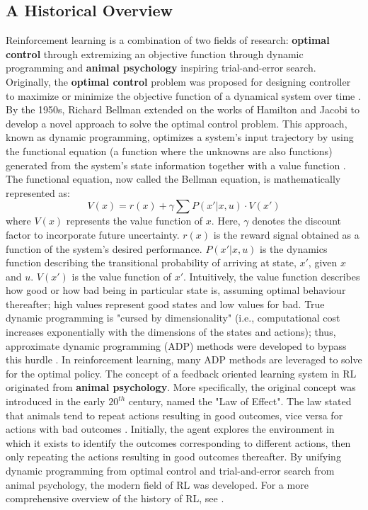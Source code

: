 \subsection{A Historical Overview}
Reinforcement learning is a combination of two fields of research: \textbf{optimal control} through extremizing an objective function through dynamic programming and \textbf{animal psychology} inspiring trial-and-error search. Originally, the \textbf{optimal control} problem was proposed for designing controller to maximize or minimize the objective function of a dynamical system over time \cite{mpc}.  By the 1950s, Richard Bellman extended on the works of Hamilton and Jacobi to develop a novel approach to solve the optimal control problem.  This approach, known as dynamic programming, optimizes a system's input trajectory by using the functional equation (a function where the unknowns are also functions) generated from the system's state information together with a value function \cite{bellman1}.  The functional equation, now called the Bellman equation, is mathematically represented as:
\begin{equation}
    V(x) = r(x) + \gamma \sum P(x' | x, u) \cdot V(x')
    \label{eq:bellman_eq}
\end{equation}
where $V(x)$ represents the value function of $x$. Here, $\gamma$ denotes the discount factor to incorporate future uncertainty. $r(x)$ is the reward signal obtained as a function of the system's desired performance. $P(x'|x, u)$ is the dynamics function describing the transitional probability of arriving at state, $x'$, given $x$ and $u$. $V(x')$ is the value function of $x'$. Intuitively, the value function describes how good or how bad being in particular state is, assuming optimal behaviour thereafter; high values represent good states and low values for bad.  True dynamic programming is "cursed by dimensionality" (i.e., computational cost increases exponentially with the dimensions of the states and actions); thus, approximate dynamic programming (ADP) methods were developed to bypass this hurdle \cite{adp}.  In reinforcement learning, many ADP methods are leveraged to solve for the optimal policy. The concept of a feedback oriented learning system in RL originated from \textbf{animal psychology}. More specifically, the original concept was introduced in the early $20^{th}$ century, named the "Law of Effect". The law stated that animals tend to repeat actions resulting in good outcomes, vice versa for actions with bad outcomes \cite{thorndike}. Initially, the agent explores the environment in which it exists to identify the outcomes corresponding to different actions, then only repeating the actions resulting in good outcomes thereafter. By unifying dynamic programming from optimal control and trial-and-error search from animal psychology, the modern field of RL was developed. For a more comprehensive overview of the history of RL, see \cite{sutton}.

